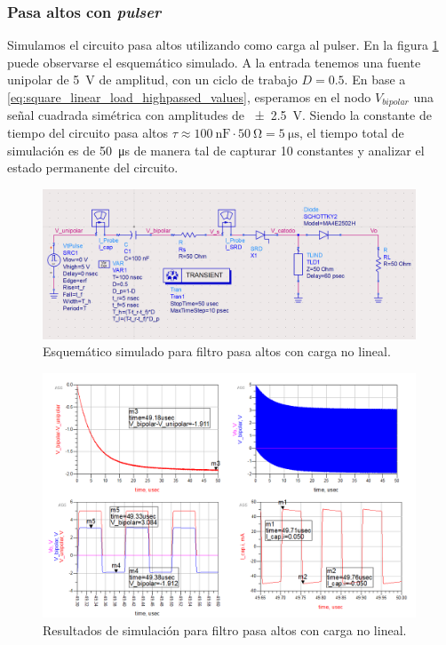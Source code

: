 \subsubsection{Pasa altos con \textit{pulser}}
\label{sec:carga_no_lineal}

Simulamos el circuito pasa altos utilizando como carga al pulser. En la figura
\ref{fig:highpass_filter_nonlinear_load_sch} puede observarse el esquemático
simulado. A la entrada tenemos una fuente unipolar de \qty{5}{\volt} de
amplitud, con un ciclo de trabajo $D=0.5$. En base a
\ref{eq:square_linear_load_highpassed_values}, esperamos en el nodo
$V_{bipolar}$ una señal cuadrada simétrica con amplitudes de
\qty{\pm2.5}{\volt}. Siendo la constante de tiempo del circuito pasa altos $\tau
\approx \qty{100}{\nano\farad} \cdot \qty{50}{\ohm} = \qty{5}{\micro\second}$,
el tiempo total de simulación es de \qty{50}{\micro\second} de manera tal de
capturar 10 constantes y analizar el estado permanente del circuito.

\begin{figure}[tbp]
    \centering
    \includegraphics[width=0.99\textwidth]{images/highpass_filter_nonlinear_load_sch.png}
    \caption{Esquemático simulado para filtro pasa altos con carga no lineal.}
    \label{fig:highpass_filter_nonlinear_load_sch}
\end{figure}

\begin{figure}[tbp]
    \centering
    \includegraphics[width=0.99\textwidth]{images/highpass_filter_nonlinear_load_sim_result.png}
    \caption{Resultados de simulación para filtro pasa altos con carga no lineal.}
    \label{fig:highpass_filter_nonlinear_load_sim_result}
\end{figure}

